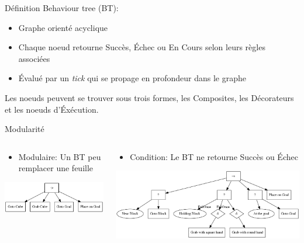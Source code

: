 \documentclass[presentation]{beamer}
\begin{document}
\begin{frame}[label=sec-2-0-2]{Définition}
\alert{Behaviour tree} (BT):
\begin{itemize}
\item Graphe orienté acyclique
\item Chaque noeud retourne Succès, Échec ou En Cours selon leurs règles associées
\item Évalué par un \emph{tick} qui se propage en profondeur dans le graphe
\end{itemize}

Les noeuds peuvent se trouver sous trois formes, les Composites, les Décorateurs et les noeuds d'Éxécution.
\end{frame}


\begin{frame}[label=sec-2-0-3]{Modularité}
\begin{columns}
\begin{column}{0.5\textwidth}

\begin{itemize}
\item Modulaire: Un BT peu remplacer une feuille
\end{itemize}


\includegraphics[width=.9\linewidth]{./img/Robot.png}
\end{column}



\begin{column}{0.5\textwidth}

\begin{itemize}
\item Condition: Le BT ne retourne Succès ou Échec
\end{itemize}


\includegraphics[width=.9\linewidth]{./img/Robot2.png}
\end{column}
\end{columns}
\end{frame}
\end{document}
